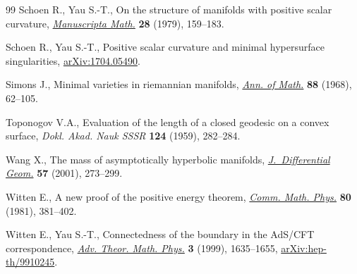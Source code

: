 \begin{thebibliography}{99}
Schoen R., Yau S.-T., On the structure of manifolds with positive scalar
 curvature, \href{https://doi.org/10.1007/BF01647970}{\textit{Manuscripta Math.}} \textbf{28} (1979), 159--183.

Schoen R., Yau S.-T., Positive scalar curvature and minimal hypersurface
 singularities, \href{https://arxiv.org/abs/1704.05490}{arXiv:1704.05490}.

Simons J., Minimal varieties in riemannian manifolds, \href{https://doi.org/10.2307/1970556}{\textit{Ann. of Math.}}
 \textbf{88} (1968), 62--105.

Toponogov V.A., Evaluation of the length of a closed geodesic on a convex
 surface, \textit{Dokl. Akad. Nauk SSSR} \textbf{124} (1959), 282--284.

Wang X., The mass of asymptotically hyperbolic manifolds,
 \href{https://doi.org/10.4310/jdg/1090348112}{\textit{J.~Differential Geom.}} \textbf{57} (2001), 273--299.

Witten E., A new proof of the positive energy theorem, \href{https://doi.org/10.1007/BF01208277}{\textit{Comm. Math.
 Phys.}} \textbf{80} (1981), 381--402.

Witten E., Yau S.-T., Connectedness of the boundary in the {A}d{S}/{CFT}
 correspondence, \href{https://doi.org/10.4310/ATMP.1999.v3.n6.a1}{\textit{Adv. Theor. Math. Phys.}} \textbf{3} (1999),
 1635--1655, \href{https://arxiv.org/abs/hep-th/9910245}{arXiv:hep-th/9910245}.

\end{thebibliography}
